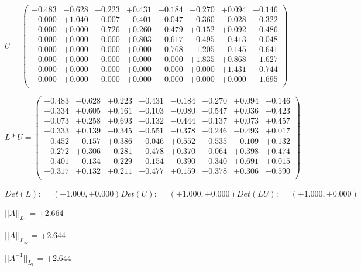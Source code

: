 \documentclass[9pt]{article}
\theoremstyle{plain}
\theoremstyle{definition}
\theoremstyle{remark}
\numberwithin{equation}{section}
\begin{document}
$U = \left(
\begin{array}{
cccccccc}
-0.483 & -0.628 & +0.223 & +0.431 & -0.184 & -0.270 & +0.094 & -0.146 \\
+0.000 & +1.040 & +0.007 & -0.401 & +0.047 & -0.360 & -0.028 & -0.322 \\
+0.000 & +0.000 & +0.726 & +0.260 & -0.479 & +0.152 & +0.092 & +0.486 \\
+0.000 & +0.000 & +0.000 & +0.803 & -0.617 & -0.495 & -0.413 & -0.048 \\
+0.000 & +0.000 & +0.000 & +0.000 & +0.768 & -1.205 & -0.145 & -0.641 \\
+0.000 & +0.000 & +0.000 & +0.000 & +0.000 & +1.835 & +0.868 & +1.627 \\
+0.000 & +0.000 & +0.000 & +0.000 & +0.000 & +0.000 & +1.431 & +0.744 \\
+0.000 & +0.000 & +0.000 & +0.000 & +0.000 & +0.000 & +0.000 & -1.695 \\
\end{array}
\right)$ \newline 

$L * U  = \left(
\begin{array}{
cccccccc}
-0.483 & -0.628 & +0.223 & +0.431 & -0.184 & -0.270 & +0.094 & -0.146 \\
-0.334 & +0.605 & +0.161 & -0.103 & -0.080 & -0.547 & +0.036 & -0.423 \\
+0.073 & +0.258 & +0.693 & +0.132 & -0.444 & +0.137 & +0.073 & +0.457 \\
+0.333 & +0.139 & -0.345 & +0.551 & -0.378 & -0.246 & -0.493 & +0.017 \\
+0.452 & -0.157 & +0.386 & +0.046 & +0.552 & -0.535 & -0.109 & +0.132 \\
-0.272 & +0.306 & -0.281 & +0.478 & +0.370 & -0.064 & +0.398 & +0.474 \\
+0.401 & -0.134 & -0.229 & -0.154 & -0.390 & -0.340 & +0.691 & +0.015 \\
+0.317 & +0.132 & +0.211 & +0.477 & +0.159 & +0.378 & +0.306 & -0.590 \\
\end{array}
\right)$ \newline 

$Det(L) :    = (+1.000,+0.000)     Det(U) :    = (+1.000,+0.000)     Det(LU) :    = (+1.000,+0.000)$

$||A||_{L_1}$  = +2.664

$||A||_{L_{\infty}}$ = +2.644

$||A^{-1}||_{L_1}$  = +2.644
\end{document}
